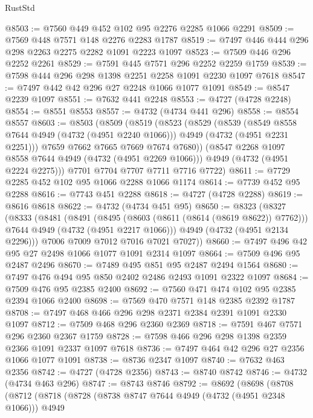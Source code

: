 \begin{lexlean}{RustStd}
\begin{coremodule}
{\begin{coremodule}
{{{{{{{{{{{{{{@8503 := @7560 @449 @452 @102 @95 @2276 @2285 @1066 @2291
@8509 := @7569 @448 @7571 @148 @2276 @2283 @1787
@8519 := @7497 @446 @444 @296 @298 @2263 @2275 @2282 @1091 @2223 @1097
@8523 := @7509 @446 @296 @2252 @2261
@8529 := @7591 @445 @7571 @296 @2252 @2259 @1759
@8539 := @7598 @444 @296 @298 @1398 @2251 @2258 @1091 @2230 @1097 @7618
@8547 := @7497 @442 @42 @296 @27 @2248 @1066 @1077 @1091
@8549 := @8547 @2239 @1097
@8551 := @7632 @441 @2248
@8553 := @4727 (@4728 @2248)
@8554 := @8551 @8553
@8557 := @4732 (@4734 @441 @296)
@8558 := @8554 @8557
@8603 := @8503
    (@8509
      (@8519
        (@8523
          (@8529
            (@8539
              (@8549 @8558 @7644 @4949 (@4732 (@4951 @2240 @1066)))
              @4949
              (@4732 (@4951 @2231 @2251)))
            @7659
            @7662
            @7665
            @7669
            @7674
            @7680))
        (@8547 @2268 @1097 @8558 @7644 @4949 (@4732 (@4951 @2269 @1066)))
        @4949
        (@4732 (@4951 @2224 @2275)))
      @7701
      @7704
      @7707
      @7711
      @7716
      @7722)
@8611 := @7729 @2285 @452 @102 @95 @1066 @2288 @1066 @1174
@8614 := @7739 @452 @95 @2288
@8616 := @7743 @451 @2288
@8618 := @4727 (@4728 @2288)
@8619 := @8616 @8618
@8622 := @4732 (@4734 @451 @95)
@8650 := @8323
    (@8327
      (@8333
        (@8481
          (@8491
            (@8495 (@8603 (@8611 (@8614 (@8619 @8622)) @7762)))
            @7644
            @4949
            (@4732 (@4951 @2217 @1066)))
          @4949
          (@4732 (@4951 @2134 @2296)))
        @7006
        @7009
        @7012
        @7016
        @7021
        @7027))
@8660 := @7497 @496 @42 @95 @27 @2498 @1066 @1077 @1091 @2314 @1097
@8664 := @7509 @496 @95 @2487 @2496
@8670 := @7489 @495 @851 @95 @2487 @2494 @1564
@8680 := @7497 @476 @494 @95 @850 @2402 @2486 @2493 @1091 @2322 @1097
@8684 := @7509 @476 @95 @2385 @2400
@8692 := @7560 @471 @474 @102 @95 @2385 @2394 @1066 @2400
@8698 := @7569 @470 @7571 @148 @2385 @2392 @1787
@8708 := @7497 @468 @466 @296 @298 @2371 @2384 @2391 @1091 @2330 @1097
@8712 := @7509 @468 @296 @2360 @2369
@8718 := @7591 @467 @7571 @296 @2360 @2367 @1759
@8728 := @7598 @466 @296 @298 @1398 @2359 @2366 @1091 @2337 @1097 @7618
@8736 := @7497 @464 @42 @296 @27 @2356 @1066 @1077 @1091
@8738 := @8736 @2347 @1097
@8740 := @7632 @463 @2356
@8742 := @4727 (@4728 @2356)
@8743 := @8740 @8742
@8746 := @4732 (@4734 @463 @296)
@8747 := @8743 @8746
@8792 := @8692
    (@8698
      (@8708
        (@8712
          (@8718
            (@8728
              (@8738 @8747 @7644 @4949 (@4732 (@4951 @2348 @1066)))
              @4949
}}}}}}}}}}}}}}
\end{coremodule}}
\end{coremodule}
\end{lexlean}
